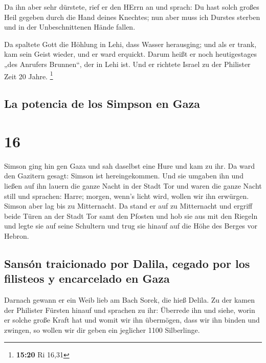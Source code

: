  Da ihn aber sehr dürstete, rief er den HErrn an und
sprach: Du hast solch großes Heil gegeben durch die Hand deines
Knechtes; nun aber muss ich Durstes sterben und in der Unbeschnittenen
Hände fallen.

 Da spaltete Gott die Höhlung in Lehi, dass Wasser
herausging; und als er trank, kam sein Geist wieder, und er ward
erquickt. Darum heißt er noch heutigestages „des Anrufers Brunnen``, der
in Lehi ist.  Und er richtete Israel zu der Philister
Zeit 20 Jahre. \footnote{\textbf{15:20} Ri 16,31}

\hypertarget{la-potencia-de-los-simpson-en-gaza}{%
\subsection{La potencia de los Simpson en
Gaza}\label{la-potencia-de-los-simpson-en-gaza}}

\hypertarget{section-15}{%
\section{16}\label{section-15}}

 Simson ging hin gen Gaza und sah daselbst eine Hure und
kam zu ihr.  Da ward den Gazitern gesagt: Simson ist
hereingekommen. Und sie umgaben ihn und ließen auf ihn lauern die ganze
Nacht in der Stadt Tor und waren die ganze Nacht still und sprachen:
Harre; morgen, wenn's licht wird, wollen wir ihn erwürgen.
 Simson aber lag bis zu Mitternacht. Da stand er auf zu
Mitternacht und ergriff beide Türen an der Stadt Tor samt den Pfosten
und hob sie aus mit den Riegeln und legte sie auf seine Schultern und
trug sie hinauf auf die Höhe des Berges vor Hebron.

\hypertarget{sansuxf3n-traicionado-por-dalila-cegado-por-los-filisteos-y-encarcelado-en-gaza}{%
\subsection{Sansón traicionado por Dalila, cegado por los filisteos y
encarcelado en
Gaza}\label{sansuxf3n-traicionado-por-dalila-cegado-por-los-filisteos-y-encarcelado-en-gaza}}

 Darnach gewann er ein Weib lieb am Bach Sorek, die hieß
Delila.  Zu der kamen der Philister Fürsten hinauf und
sprachen zu ihr: Überrede ihn und siehe, worin er solche große Kraft hat
und womit wir ihn übermögen, dass wir ihn binden und zwingen, so wollen
wir dir geben ein jeglicher 1100 Silberlinge.

